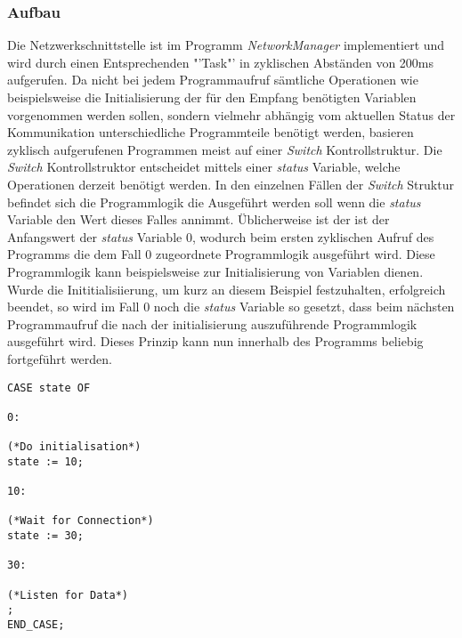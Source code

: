 \subsubsection{Aufbau}
Die Netzwerkschnittstelle ist im Programm \textit{NetworkManager} implementiert und wird durch einen Entsprechenden "'Task"' in zyklischen Abständen von 200ms aufgerufen. Da nicht bei jedem Programmaufruf sämtliche Operationen wie beispielsweise die Initialisierung der für den Empfang benötigten Variablen vorgenommen werden sollen, sondern vielmehr abhängig vom aktuellen Status der Kommunikation unterschiedliche Programmteile benötigt werden, basieren zyklisch aufgerufenen Programmen meist auf einer \textit{Switch} Kontrollstruktur. Die \textit{Switch} Kontrollstruktor entscheidet mittels einer \textit{status} Variable, welche Operationen derzeit benötigt werden. In den einzelnen Fällen der \textit{Switch} Struktur befindet sich die Programmlogik die Ausgeführt werden soll wenn die \textit{status} Variable den Wert dieses Falles annimmt. Üblicherweise ist der ist der Anfangswert der \textit{status} Variable 0, wodurch beim ersten zyklischen Aufruf des Programms die dem Fall 0 zugeordnete Programmlogik ausgeführt wird. Diese Programmlogik kann beispielsweise zur Initialisierung von Variablen dienen. Wurde die Inititialisiierung, um kurz an diesem Beispiel festzuhalten, erfolgreich beendet, so wird im Fall 0 noch die \textit{status} Variable so gesetzt, dass beim nächsten Programmaufruf die nach der initialisierung auszuführende Programmlogik ausgeführt wird. Dieses Prinzip kann nun innerhalb des Programms beliebig fortgeführt werden.
\begin{lstlisting}[language = codesysls, captionpos=b, caption={Kontrollstruktur anhand eines Beispiels}]
CASE state OF

0:

(*Do initialisation*)
state := 10;

10:

(*Wait for Connection*)
state := 30;

30:

(*Listen for Data*)
;
END_CASE;
\end{lstlisting}

